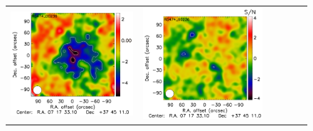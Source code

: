 \documentclass[traditabstract]{aa}
\begin{document}
\begin{figure}[h]
{\begin{tabular}{llllll}
\includegraphics[trim=2.3cm 0.7cm 0cm 0cm, clip=true, scale=1]{Figure/Map_RG474_00236_Ymap_zobs0p4_processed_deconv.pdf} & 
\includegraphics[trim=2.3cm 0.7cm 0cm 0cm, clip=true, scale=1]{Figure/Map_RG474_00236_Ymap_zobs0p4_diff.pdf} & 

\end{tabular}}
\end{figure}
\end{document}
